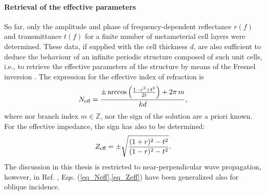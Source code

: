 \paragraph{Retrieval of the effective parameters} %
So far, only the amplitude and phase of frequency-dependent reflectance $r(f)$ and transmittance $t(f)$ for a finite number of metameterial cell layers were determined. 
These data, if supplied with the cell thickness $d$, are also sufficient to deduce the behaviour of an infinite periodic structure composed of such unit cells, i.e., to retrieve the effective parameters of the structure by means of the Fresnel inversion \cite{smith2002determination} \cite[pp. 51-55]{shalaev2010book}. 
The expression for the effective index of refraction is
\begin{equation} N_{\text{eff} } = \frac{\pm \arccos\left(\frac{1 - r^2+t^2}{2 t}\right) + 2\pi\,m}{k d}, \label{eq_Neff} \end{equation}
where nor branch index $m\in \mathbb{Z}$, nor the sign of the solution are a priori known. For the effective impedance, the sign has also to be determined: 
\begin{equation} Z_{\text{eff} } = \pm \sqrt{\frac{(1+r)^2 - t^2}{(1-r)^2 - t^2}}. \label{eq_Zeff} \end{equation}
	The discussion in this thesis is restricted to near-perpendicular wave propagation, however, in Ref. \cite{menzel2008retrieving}, Eqs. (\ref{eq_Neff},\ref{eq_Zeff}) have been generalized also for oblique incidence.

